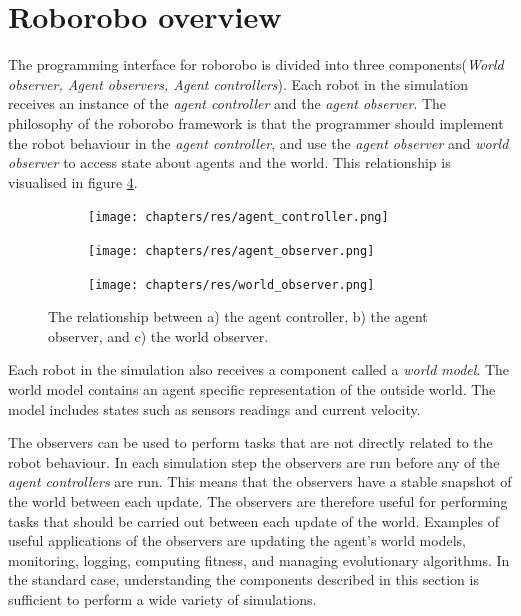 \section{Roborobo overview}
The programming interface for roborobo is divided into three components(\emph{World observer, Agent observers, Agent controllers})\cite{bredeche_roborobo!_2013}.
Each robot in the simulation receives an instance of the \emph{agent controller} and the \emph{agent observer}.
The philosophy of the roborobo framework is that the programmer should implement the robot behaviour in the \emph{agent controller}, and use the \emph{agent observer} and \emph{world observer} to access state about agents and the world.
This relationship is visualised in figure \ref{fig:component-relationship}.

\begin{figure}[H]
	\centering
	\begin{subfigure}{0.31\textwidth}
		\label{fig:controller}
		\centering
		\hspace*{1.15cm}\texttt{[image: chapters/res/agent\_controller.png]}
		\caption{}
	\end{subfigure}
	\begin{subfigure}{0.31\textwidth}
		\label{fig:agent-observer}
		\centering
		\texttt{[image: chapters/res/agent\_observer.png]}
		\caption{}
	\end{subfigure}
	\begin{subfigure}{0.31\textwidth}
		\label{fig:world-observer}
		\centering
		\texttt{[image: chapters/res/world\_observer.png]}
		\caption{}
	\end{subfigure}
	\caption{The relationship between a) the agent controller, b) the agent observer, and c) the world observer. }
	\label{fig:component-relationship}
\end{figure}

Each robot in the simulation also receives a component called a \emph{world model}.
The world model contains an agent specific representation of the outside world.
The model includes states such as sensors readings and current velocity.

The observers can be used to perform tasks that are not directly related to the robot behaviour.
In each simulation step the observers are run before any of the \emph{agent controllers} are run.
This means that the observers have a stable snapshot of the world between each update.
The observers are therefore useful for performing tasks that should be carried out between each update of the world.
Examples of useful applications of the observers are updating the agent's world models, monitoring, logging, computing fitness, and managing evolutionary algorithms.
In the standard case, understanding the components described in this section is sufficient to perform a wide variety of simulations.

